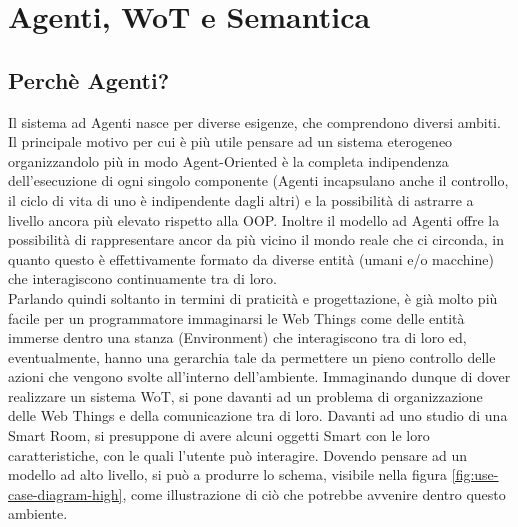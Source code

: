 \documentclass[12pt,a4paper,openright,oneside]{report}
\begin{document}
\clearpage{\pagestyle{empty}\cleardoublepage}
\chapter{Agenti, WoT e Semantica}           %
\lhead[\fancyplain{}{\bfseries\thepage}]{\fancyplain{}{\bfseries\rightmark}}  

\section{Perchè Agenti?}
Il sistema ad Agenti nasce per diverse esigenze, che comprendono diversi ambiti. Il principale motivo per cui è più utile pensare ad un sistema eterogeneo organizzandolo più in modo Agent-Oriented è la completa indipendenza dell'esecuzione di ogni singolo componente (Agenti incapsulano anche il controllo, il ciclo di vita di uno è indipendente dagli altri) e la possibilità di astrarre a livello ancora più elevato rispetto alla OOP. Inoltre il modello ad Agenti offre la possibilità di rappresentare ancor da più vicino il mondo reale che ci circonda, in quanto questo è effettivamente formato da diverse entità (umani e/o macchine) che interagiscono continuamente tra di loro.\\

Parlando quindi soltanto in termini di praticità e progettazione, è già molto più facile per un programmatore immaginarsi le Web Things come delle entità immerse dentro una stanza (Environment) che interagiscono tra di loro ed, eventualmente, hanno una gerarchia tale da permettere un pieno controllo delle azioni che vengono svolte all'interno dell'ambiente. Immaginando dunque di dover realizzare un sistema WoT, si pone davanti ad un problema di organizzazione delle Web Things e della comunicazione tra di loro. Davanti ad uno studio di una Smart Room, si presuppone di avere alcuni oggetti Smart con le loro caratteristiche, con le quali l'utente può interagire. Dovendo pensare ad un modello ad alto livello, si può a produrre lo schema, visibile nella figura \ref{fig:use-case-diagram-high}, come illustrazione di ciò che potrebbe avvenire dentro questo ambiente.\\
\end{document}
